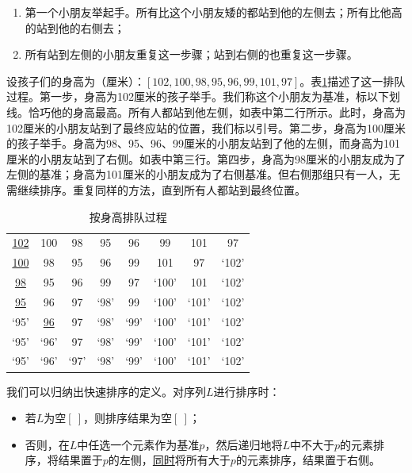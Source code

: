 \documentclass[b5paper]{ctexart}
\begin{document}
\begin{enumerate}
  \item 第一个小朋友举起手。所有比这个小朋友矮的都站到他的左侧去；所有比他高的站到他的右侧去；
  \item 所有站到左侧的小朋友重复这一步骤；站到右侧的也重复这一步骤。
\end{enumerate}

设孩子们的身高为（厘米）：$[102, 100, 98, 95, 96, 99, 101, 97]$。表\ref{tab:kids-sort}描述了这一排队过程。第一步，身高为102厘米的孩子举手。我们称这个小朋友为基准，标以下划线。恰巧他的身高最高。所有人都站到他左侧，如表中第二行所示。此时，身高为102厘米的小朋友站到了最终应站的位置，我们标以引号。第二步，身高为100厘米的孩子举手。身高为98、95、96、99厘米的小朋友站到了他的左侧，而身高为101厘米的小朋友站到了右侧。如表中第三行。第四步，身高为98厘米的小朋友成为了左侧的基准；身高为101厘米的小朋友成为了右侧基准。但右侧那组只有一人，无需继续排序。重复同样的方法，直到所有人都站到最终位置。

\begin{table}[htbp]
\centering
\begin{tabular}{ | c c c c c c c c |}
\hline
\underline{102} & 100 & 98 & 95 & 96 & 99 & 101 & 97 \\
\underline{100} & 98 & 95 & 96 & 99 & 101 & 97 & `102' \\
\underline{98} & 95 & 96 & 99 & 97 & `100' & 101 & `102' \\
\underline{95} & 96 & 97 & `98' & 99 & `100' & `101' & `102' \\
`95' & \underline{96} & 97 & `98' & `99' & `100' & `101' & `102' \\
`95' & `96' & 97 & `98' & `99' & `100' & `101' & `102' \\
`95' & `96' & `97' & `98' & `99' & `100' & `101' & `102' \\
\hline
\end{tabular}
\caption{按身高排队过程}
\label{tab:kids-sort}
\end{table}

我们可以归纳出快速排序的定义。对序列$L$进行排序时：

\begin{itemize}
\item 若$L$为空$[\ ]$，则排序结果为空$[\ ]$；
\item 否则，在$L$中任选一个元素作为基准$p$，然后递归地将$L$中不大于$p$的元素排序，将结果置于$p$的左侧，\underline{同时}将所有大于$p$的元素排序，结果置于右侧。
\end{itemize}
\end{document}
